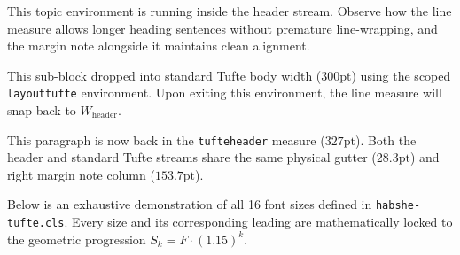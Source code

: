 \documentclass[paper=a4, fontsize=9]{habshe-tufte}
\begin{document}
\begin{topic}
  This topic environment is running inside the header stream. Observe how the line measure allows longer heading sentences without premature line-wrapping, and the margin note alongside it maintains clean alignment.
\end{topic}

\lipsum[12]

\begin{layouttufte}
  This sub-block dropped into standard Tufte body width ($300\text{pt}$) using the scoped \texttt{layouttufte} environment. Upon exiting this environment, the line measure will snap back to $W_{\text{header}}$.
  
  \lipsum[14]
\end{layouttufte}

This paragraph is now back in the \texttt{tufteheader} measure ($327\text{pt}$). Both the header and standard Tufte streams share the same physical gutter ($28.3\text{pt}$) and right margin note column ($153.7\text{pt}$).

\newpage
\setlayoutfullwidth

\subject{Part V: 16-Tier Typographic Scale Specimen}


Below is an exhaustive demonstration of all 16 font sizes defined in \texttt{habshe-tufte.cls}. Every size and its corresponding leading are mathematically locked to the geometric progression $S_k = F \cdot (1.15)^k$.
\end{document}
